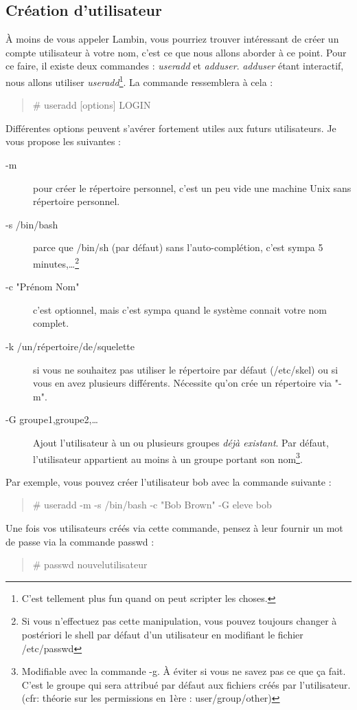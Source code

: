 \documentclass[a4paper,11pt]{article}
\newcommand{\commande}[1] {
    \begin{quote}
    \tt\raggedright #1 
    \end{quote}
}
\begin{document}
\subsection{Création d'utilisateur}
\par À moins de vous appeler Lambin, vous pourriez trouver intéressant de créer un compte utilisateur à votre nom, c'est ce que nous allons aborder à ce point. Pour ce faire, il existe deux commandes : \emph{useradd} et \emph{adduser}. \emph{adduser} étant interactif, nous allons utiliser \emph{useradd}\footnote{C'est tellement plus fun quand on peut scripter les choses.}. La commande ressemblera à cela :
\commande{\# useradd [options] LOGIN}
\par Différentes options peuvent s'avérer fortement utiles aux futurs utilisateurs. Je vous propose les suivantes :
\begin{description}
    \item[-m] pour créer le répertoire personnel, c'est un peu vide une machine Unix sans répertoire personnel.
    \item[-s /bin/bash] parce que /bin/sh (par défaut) sans l'auto-complétion, c'est sympa 5 minutes,\ldots\footnote{Si vous n'effectuez pas cette manipulation, vous pouvez toujours changer à postériori le shell par défaut d'un utilisateur en modifiant le fichier /etc/passwd}
    \item[-c "Prénom Nom"] c'est optionnel, mais c'est sympa quand le système connait votre nom complet.
    \item [-k /un/répertoire/de/squelette] si vous ne souhaitez pas utiliser le répertoire par défaut (/etc/skel) ou si vous en avez plusieurs différents. Nécessite qu'on crée un répertoire via "-m".
    \item[-G groupe1,groupe2,\dots] Ajout l'utilisateur à un ou plusieurs groupes \emph{déjà existant}. Par défaut, l'utilisateur appartient au moins à un groupe portant son nom\footnote{Modifiable avec la commande -g. À éviter si vous ne savez pas ce que ça fait. C'est le groupe qui sera attribué par défaut aux fichiers créés par l'utilisateur. (cfr: théorie sur les permissions en 1ère : user/group/other)}.
\end{description}
\par Par exemple, vous pouvez créer l'utilisateur bob avec la commande suivante :
\commande{\# useradd -m -s /bin/bash -c "Bob Brown" -G eleve bob}
\par Une fois vos utilisateurs créés via cette commande, pensez à leur fournir un mot de passe via la commande passwd :
\commande{\# passwd nouvelutilisateur}
\end{document}
